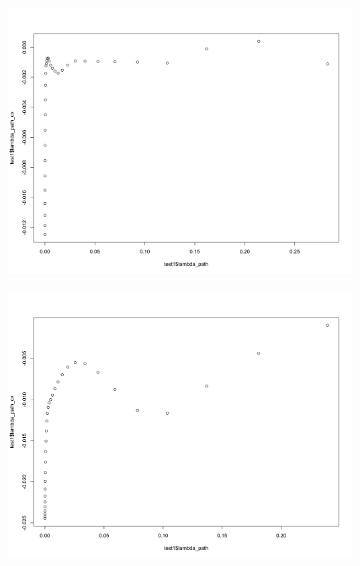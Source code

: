 \documentclass[letterpaper]{article}
\begin{document}
\begin{figure}[H]
\centering
\begin{subfigure}{0.5\textwidth}
  \centering
  \includegraphics[width=1\linewidth]{./result_plot/correct/3_path_plot}
\end{subfigure}%
\begin{subfigure}{.5\textwidth}
  \centering
  \includegraphics[width=1\linewidth]{./result_plot/correct/4_path_plot}
\end{subfigure}

\end{figure}
\end{document}
